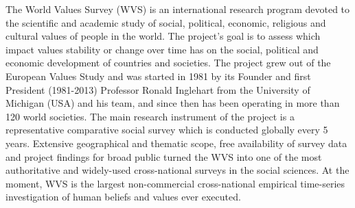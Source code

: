 \documentclass{amsart}
\begin{document}
The World Values Survey (WVS) is an international research program devoted to the scientific and academic study of social, political, economic, religious and cultural values of people in the world. The project’s goal is to assess which impact values stability or change over time has on the social, political and economic development of countries and societies. The project grew out of the European Values Study and was started in 1981 by its Founder and first President (1981-2013) Professor Ronald Inglehart from the University of Michigan (USA) and his team, and since then has been operating in more than 120 world societies. The main research instrument of the project is a representative comparative social survey which is conducted globally every 5 years. Extensive geographical and thematic scope, free availability of survey data and project findings for broad public turned the WVS into one of the most authoritative and widely-used cross-national surveys in the social sciences. At the moment, WVS is the largest non-commercial cross-national empirical time-series investigation of human beliefs and values ever executed. 
\end{document}
